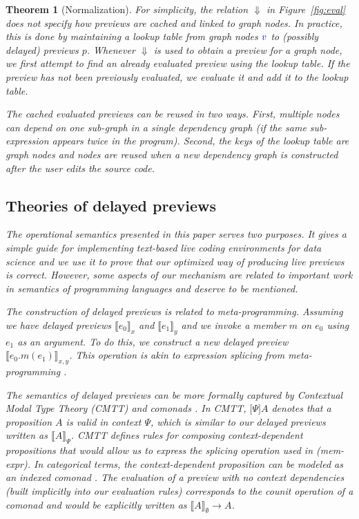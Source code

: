 \documentclass[acmsmall,anonymous,fleqn]{acmart}\settopmatter{printfolios=false,printccs=false,printacmref=false}
\newcounter{thc}
\theoremstyle{plain}
\newtheorem{theorem}[thc]{Theorem}
\theoremstyle{definition}
\newcommand{\bndclr}[1]{\textcolor{kvdclr}{#1}}
\newcommand{\rname}[1]{{\sffamily\small(#1)}}
\begin{document}
\begin{theorem}[Normalization]
For simplicity, the relation $\Downarrow$ in Figure~\ref{fig:eval} does not specify how previews
are cached and linked to graph nodes. In practice, this is done by maintaining a lookup table
from graph nodes $\bndclr{v}$ to (possibly delayed) previews $p$.
Whenever $\Downarrow$ is used to obtain a preview for a graph node, we first
attempt to find an already evaluated preview using the lookup table. If the preview has not
been previously evaluated, we evaluate it and add it to the lookup table.

The cached evaluated previews can be reused in two ways. First, multiple nodes can
depend on one sub-graph in a single dependency graph (if the same sub-expression appears
twice in the program). Second, the keys of the lookup table are graph nodes and nodes are
reused when a new dependency graph is constructed after the user edits the source code.

\subsection{Theories of delayed previews}
The operational semantics presented in this paper serves two purposes. It gives a simple guide
for implementing text-based live coding environments for data science and we use it to prove that
our optimized way of producing live previews is correct. However, some aspects of our mechanism
are related to important work in semantics of programming languages and deserve to be mentioned.

The construction of delayed previews is related to meta-programming. Assuming
we have delayed previews $\llbracket e_0 \rrbracket_x$ and $\llbracket e_1 \rrbracket_y$ and
we invoke a member $m$ on $e_0$ using $e_1$ as an argument. To do this, we construct a new
delayed preview $\llbracket e_0.m(e_1) \rrbracket_{x, y}$. This operation is akin to expression
splicing from meta-programming \cite{metaml,quotations}.

The semantics of delayed previews can be more formally captured by Contextual Modal Type Theory
(CMTT) \cite{cmtt} and comonads \cite{cmtt-denotation}. In CMTT, $\lbrack \Psi \rbrack A$ denotes
that a proposition $A$ is valid in context $\Psi$, which is similar to our delayed previews written
as $\llbracket A \rrbracket_\Psi$. CMTT defines rules for composing context-dependent propositions
that would allow us to express the splicing operation used in \rname{mem-expr}. In categorical
terms, the context-dependent proposition can be modeled as an indexed comonad \cite{effectrev,graded}.
The evaluation of a preview with no context dependencies (built implicitly into our evaluation rules)
corresponds to the counit operation of a comonad and would be explicitly written as
$\llbracket A \rrbracket_\emptyset \rightarrow A$.


\end{theorem}
\end{document}
